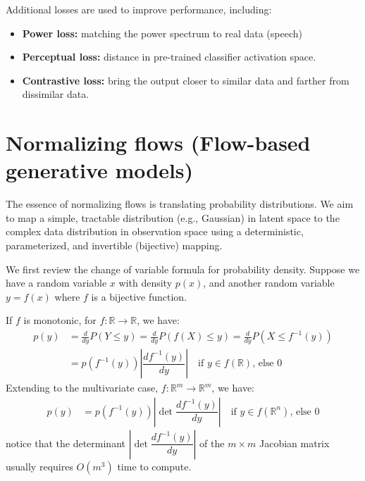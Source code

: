 \documentclass{mytufte-light}
\begin{document}
Additional losses are used to improve performance, including:
\begin{itemize}
    \item \textbf{Power loss:} matching the power spectrum to real data (speech)
    \item \textbf{Perceptual loss:} distance in pre-trained classifier activation space. 
    \item \textbf{Contrastive loss:} bring the output closer to similar data and farther from dissimilar data.
\end{itemize}


\clearpage
\section{Normalizing flows (Flow-based generative models)}
The essence of normalizing flows is translating probability distributions. We aim to map a 
simple, tractable distribution (e.g., Gaussian) in latent space
to the complex data distribution in observation space using a deterministic, parameterized, and invertible (bijective) mapping.

We first review the change of variable formula for probability density.
Suppose we have a random variable \( x \) with density \( p(x) \), and
another random variable \( y = f(x) \) where \( f \) is a bijective function. 

If \( f \) is monotonic, for \( f: \mathbb{R} \to \mathbb{R}\), we have:
\begin{align}
    p(y) &= \frac{d}{dy}P(Y \leq y) = \frac{d}{dy}P(f(X) \leq y) = \frac{d}{dy}P(X \leq f^{-1}(y))\\
    &= p(f^{-1}(y)) \left| \dfrac{df^{-1}(y)}{dy} \right| \quad \text{if } y \in f(\mathbb{R}) \text{, else } 0
\end{align}
Extending to the multivariate case, \( f: \mathbb{R}^m \to \mathbb{R}^m \),
we have:
\begin{align}
    p(y) &= p(f^{-1}(y)) \left| \det \dfrac{df^{-1}(y)}{dy} \right| \quad \text{if } y \in f(\mathbb{R}^n) \text{, else } 0
\end{align}
notice that the determinant \( \left| \det \dfrac{df^{-1}(y)}{dy} \right| \) of the \( m \times m \) Jacobian matrix 
usually requires \( O(m^3) \) time to compute.
\end{document}
